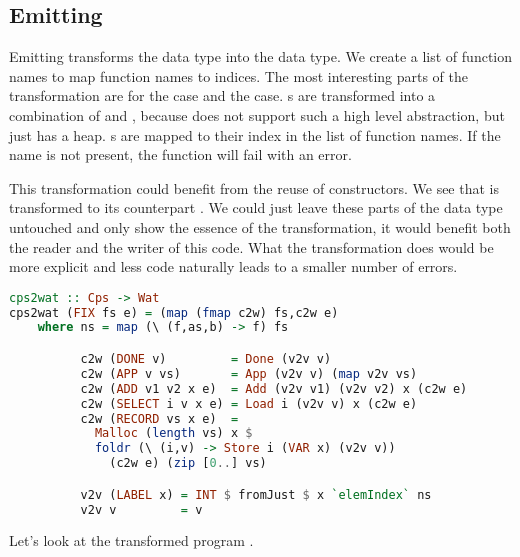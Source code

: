 {\subsection{\label{section:emit}Emitting}
Emitting transforms the  data type into the  data type. We create a list of function names  to map function names to indices. The most interesting parts of the transformation are for the  case and the  case. s are transformed into a combination of  and , because  does not support such a high level abstraction, but just has a heap. s are mapped to their index in the list of function names. If the name is not present, the function will fail with an error.

This transformation could benefit from the reuse of constructors. We see that  is transformed to its  counterpart . We could just leave these parts of the data type untouched and only show the essence of the transformation, it would benefit both the reader and the writer of this code. What the transformation does would be more explicit and less code naturally leads to a smaller number of errors.

\begin{lstlisting}[language=Haskell]
cps2wat :: Cps -> Wat
cps2wat (FIX fs e) = (map (fmap c2w) fs,c2w e)
    where ns = map (\ (f,as,b) -> f) fs

          c2w (DONE v)         = Done (v2v v)
          c2w (APP v vs)       = App (v2v v) (map v2v vs)
          c2w (ADD v1 v2 x e)  = Add (v2v v1) (v2v v2) x (c2w e)
          c2w (SELECT i v x e) = Load i (v2v v) x (c2w e)
          c2w (RECORD vs x e)  =
            Malloc (length vs) x $
            foldr (\ (i,v) -> Store i (VAR x) (v2v v))
              (c2w e) (zip [0..] vs)

          v2v (LABEL x) = INT $ fromJust $ x `elemIndex` ns
          v2v v         = v
\end{lstlisting}

Let's look at the transformed program .

}
